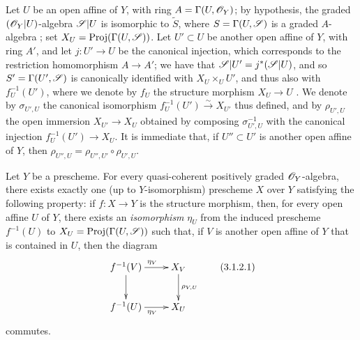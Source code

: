 \begin{env}[3.1.1]
Let $U$ be an open affine of $Y$, with ring $A=\Gamma(U,\mathscr{O}_Y)$;
by hypothesis, the graded $(\mathscr{O}_Y|U)$-algebra $\mathscr{S}|U$ is isomorphic to $\widetilde{S}$, where $S=\Gamma(U,\mathscr{S})$ is a graded $A$-algebra ;
set $X_U=\operatorname{Proj}(\Gamma(U,\mathscr{S}))$.
Let $U'\subset U$ be another open affine of $Y$, with ring $A'$, and let $j:U'\to U$ be the canonical injection, which corresponds to the restriction homomorphism $A\to A'$;
we have that $\mathscr{S}|U'=j^*(\mathscr{S}|U)$, and so $S'=\Gamma(U',\mathscr{S})$ is canonically identified with $X_U\times_U U'$, and thus also with $f_U^{-1}(U')$, where we denote by $f_U$ the structure morphism $X_U\to U$ .
We denote by $\sigma_{U',U}$ the canonical isomorphism $f_U^{-1}(U')\xrightarrow{\sim}X_{U'}$ thus defined, and by $\rho_{U',U}$ the open immersion $X_{U'}\to X_U$ obtained by composing $\sigma_{U',U}^{-1}$ with the canonical injection $f_U^{-1}(U')\to X_U$.
It is immediate that, if $U''\subset U'$ is another open affine of $Y$, then $\rho_{U'',U}=\rho_{U'',U'}\circ\rho_{U',U}$.
\end{env}

\begin{proposition}[3.1.2]
\label{II.3.1.2}
Let $Y$ be a prescheme.
For every quasi-coherent positively graded $\mathscr{O}_Y$-algebra, there exists exactly one (up to $Y$-isomorphism) prescheme $X$ over $Y$ satisfying the following property:
if $f:X\to Y$ is the structure morphism, then, for every open affine $U$ of $Y$, there exists an \emph{isomorphism} $\eta_U$ from the induced prescheme $f^{-1}(U)$ to $X_U=\operatorname{Proj}(\Gamma(U,\mathscr{S}))$ such that, if $V$ is another open affine of $Y$ that is contained in $U$, then the diagram
\[
\label{II.3.1.2.1}
  \xymatrix{
    f^{-1}(V) \ar[r]^{\eta_V} \ar[d]
    & X_V \ar[d]^{\rho_{V,U}}
  \\f^{-1}(U) \ar[r]_{\eta_V}
    & X_U
  }
\tag{3.1.2.1}
\]
commutes.
\end{proposition}

